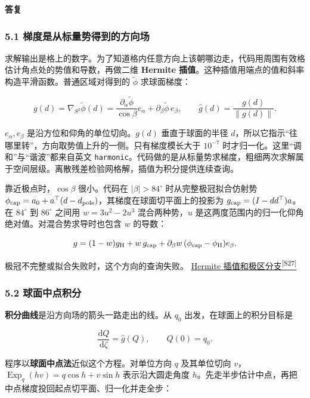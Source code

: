 \documentclass[11pt,a4paper]{article}
\numberwithin{equation}{topic}
\newenvironment{reply}{%
  \par\noindent\textcolor{replycolor}{\sffamily\bfseries 答复}\par\nobreak\ignorespaces
}{\par\medskip}
\newcommand{\sourceref}[2]{\hyperlink{source-#1}{#2\textsuperscript{[#1]}}}
\begin{document}
\begin{reply}
\subsubsection*{5.1 梯度是从标量势得到的方向场}

求解输出是格上的数字。为了知道格内任意方向上该朝哪边走，代码用周围有效格估计角点处的势值和导数，再做二维 \textbf{Hermite 插值}。这种插值用端点的值和斜率构造平滑函数。普通区域对得到的 \(\tilde\phi\) 求球面梯度：

\begin{equation}
\label{eq:gradient}
g(d)=\nabla_{S^2}\tilde\phi(d)
=\frac{\partial_\alpha\tilde\phi}{\cos\beta}e_\alpha
+\partial_\beta\tilde\phi\,e_\beta,\qquad
\hat g(d)=\frac{g(d)}{\|g(d)\|}.
\end{equation}

\(e_\alpha,e_\beta\) 是沿方位和仰角的单位切向。\(g(d)\) 垂直于球面的半径 \(d\)，所以它指示“往哪里转”，方向取势值上升的一侧。只有梯度模长大于 \(10^{-7}\) 时才归一化。这里“调和”与“谐波”都来自英文 \texttt{harmonic}。代码做的是从标量势求梯度，粗细两次求解属于空间层级。离散残差检验网格解，插值为积分提供连续查询。

靠近极点时，\(\cos\beta\) 很小。代码在 \(|\beta|>84^\circ\) 时从完整极冠拟合仿射势 \(\phi_{\rm cap}=a_0+a^\top(d-d_{\rm pole})\)，其梯度在球面切平面上的投影为 \(g_{\rm cap}=(I-dd^\top)a\)。在 \(84^\circ\) 到 \(86^\circ\) 之间用 \(w=3u^2-2u^3\) 混合两种势，\(u\) 是这两度范围内的归一化仰角绝对值。对混合势求导时也包含 \(w\) 的导数：

\begin{equation}
\label{eq:polar}
g=(1-w)g_{\rm H}+w\,g_{\rm cap}
  +\partial_\beta w\,(\phi_{\rm cap}-\phi_{\rm H})e_\beta.
\end{equation}

极冠不完整或拟合失败时，这个方向的查询失败。 \sourceref{S27}{Hermite 插值和极区分支}

\subsubsection*{5.2 球面中点积分}

\textbf{积分曲线}是沿方向场的箭头一路走出的线。从 \(q_0\) 出发，在球面上的积分目标是

\begin{equation}
\label{eq:ode}
\frac{\mathrm dQ}{\mathrm d\zeta}=\hat g(Q),
\qquad Q(0)=q_0.
\end{equation}

程序以\textbf{球面中点法}近似这个方程。对单位方向 \(q\) 及其单位切向 \(v\)，\(\operatorname{Exp}_q(hv)=q\cos h+v\sin h\) 表示沿大圆走角度 \(h\)。先走半步估计中点，再把中点梯度投回起点切平面、归一化并走全步：


\end{reply}
\end{document}
